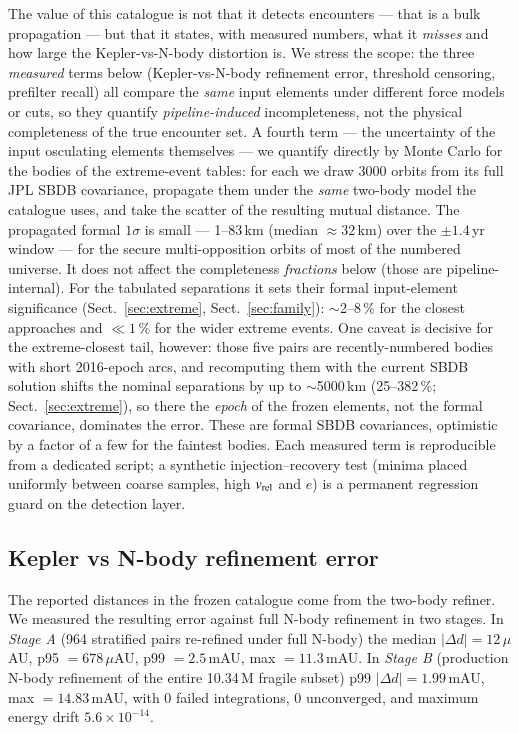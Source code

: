 \documentclass{aa}
\begin{document}
The value of this catalogue is not that it detects encounters --- that is a bulk
propagation --- but that it states, with measured numbers, what it \emph{misses}
and how large the Kepler-vs-N-body distortion is. We stress the scope: the three
\emph{measured} terms below (Kepler-vs-N-body refinement error, threshold
censoring, prefilter recall) all compare the \emph{same} input elements under
different force models or cuts, so they quantify \emph{pipeline-induced}
incompleteness, not the physical completeness of the true encounter set. A
fourth term --- the uncertainty of the input osculating elements themselves ---
we quantify directly by Monte Carlo for the bodies of the extreme-event tables:
for each we draw $3000$ orbits from its full JPL SBDB covariance, propagate them
under the \emph{same} two-body model the catalogue uses, and take the scatter of
the resulting mutual distance. The propagated formal $1\sigma$ is small --- 1--83\,km (median $\approx32$\,km)
over the $\pm1.4$\,yr window --- for the secure multi-opposition orbits of most of
the numbered universe. It does not affect the completeness \emph{fractions} below
(those are pipeline-internal). For the tabulated separations it sets their formal
input-element significance (Sect.~\ref{sec:extreme}, Sect.~\ref{sec:family}):
$\sim$2--8\,\% for the closest approaches and $\ll1$\,\% for the wider extreme
events. One caveat is decisive for the extreme-closest tail, however: those five
pairs are recently-numbered bodies with short 2016-epoch arcs, and recomputing
them with the current SBDB solution shifts the nominal separations by up to
$\sim$5000\,km (25--382\,\%; Sect.~\ref{sec:extreme}), so there the \emph{epoch} of
the frozen elements, not the formal covariance, dominates the error. These are
formal SBDB covariances, optimistic by a factor of a few for the faintest bodies. Each measured term is
reproducible from a dedicated script; a synthetic injection--recovery test (minima
placed uniformly between coarse samples, high $v_{\rm rel}$ and $e$) is a permanent
regression guard on the detection layer.

\subsection{Kepler vs N-body refinement error}
\label{sec:refineerror}

The reported distances in the frozen catalogue come from the two-body refiner.
We measured the resulting error against full N-body refinement in two stages.
In \emph{Stage A} (964 stratified pairs re-refined under full N-body) the median
$|\Delta d| = 12\,\mu$AU, p95 $= 678\,\mu$AU, p99 $= 2.5$\,mAU, max
$= 11.3$\,mAU. In \emph{Stage B} (production N-body refinement of the entire
10.34\,M fragile subset) p99 $|\Delta d| = 1.99$\,mAU, max $= 14.83$\,mAU, with
0 failed integrations, 0 unconverged, and maximum energy drift
$5.6\times10^{-14}$.
\end{document}
